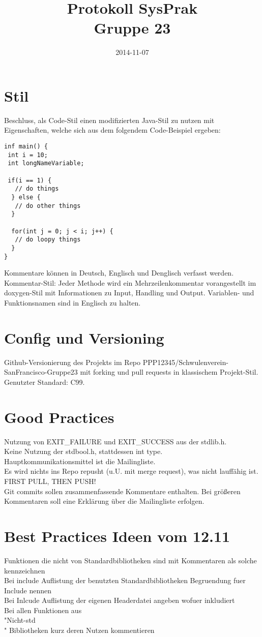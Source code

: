 \documentclass[11pt]{article}
\title{\textbf{Protokoll SysPrak\\Gruppe 23}}
\author{}
\date{2014-11-07}
\begin{document}
\maketitle

\section*{Stil}
Beschluss, als Code-Stil einen modifizierten Java-Stil zu nutzen mit Eigenschaften, welche sich aus dem folgendem Code-Beispiel ergeben:
\begin{verbatim}
inf main() {
 int i = 10;
 int longNameVariable;
 
 if(i == 1) {
   // do things
  } else {
   // do other things
  }
  
  for(int j = 0; j < i; j++) {
   // do loopy things
  }
}
\end{verbatim}
Kommentare können in Deutsch, Englisch und Denglisch verfasst werden.\\
Kommentar-Stil: Jeder Methode wird ein Mehrzeilenkommentar vorangestellt im doxygen-Stil mit Informationen zu Input, Handling und Output.
Variablen- und Funktionsnamen sind in Englisch zu halten.\\
\section*{Config und Versioning}
Github-Versionierung des Projekts im Repo PPP12345/Schwulenverein-SanFrancisco-Gruppe23 mit forking und pull requests in klassischem Projekt-Stil.\\
Genutzter Standard: C99.\\
\section*{Good Practices}
Nutzung von EXIT\_FAILURE und EXIT\_SUCCESS aus der stdlib.h.\\
Keine Nutzung der stdbool.h, stattdessen int type.\\
Hauptkommunikationsmittel ist die Mailingliste.\\
Es wird nichts ins Repo repusht (u.U. mit merge request), was nicht lauffähig ist.\\
FIRST PULL, THEN PUSH!\\
Git commits sollen zusammenfassende Kommentare enthalten. Bei größeren Kommentaren soll eine Erklärung über die Mailingliste erfolgen.

\section*{Best Practices Ideen vom 12.11}
Funktionen die nicht von Standardbibliotheken sind mit Kommentaren als solche kennzeichnen\\
Bei include Auflistung der benutzten Standardbibliotheken Begruendung fuer Include nennen\\
Bei Inlcude Auflistung der eigenen Headerdatei angeben wofuer inkludiert\\
Bei allen Funktionen aus \\"Nicht-std\\" Bibliotheken kurz deren Nutzen kommentieren\\
\end{document}
